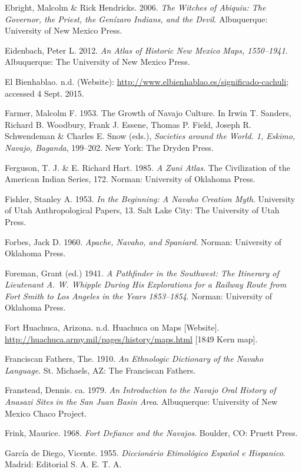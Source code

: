 \begin{hang}
	Ebright, Malcolm \& Rick Hendricks. 2006. \textit{The Witches of Abiquiu: The Governor, the Priest, the Genízaro Indians, and the Devil}.  Albuquerque:  University of New Mexico Press.

	Eidenbach, Peter L.  2012.  \textit{An Atlas of Historic New Mexico Maps, 1550--1941}.  Albuquerque:  The University of New Mexico Press.

	El Bienhablao. n.d.  (Website): \url{http://www.elbienhablao.es/significado-cachuli}; accessed 4 Sept. 2015.

	Farmer, Malcolm F.  1953.  The Growth of Navajo Culture.  In  Irwin T. Sanders, Richard B. Woodbury, Frank J. Essene, Thomas P. Field, Joseph R. Schwendeman \& Charles E. Snow (eds.), \textit{Societies around the World.  1, Eskimo, Navajo, Baganda},   199--202.  New York:  The Dryden Press.

	Ferguson, T. J. \& E. Richard Hart. 1985. \textit{A Zuni Atlas}.  The Civilization of the American Indian Series, 172.  Norman:  University of Oklahoma Press.

	Fishler, Stanley A.  1953. \textit{In the Beginning: A Navaho Creation Myth}.  University of Utah Anthropological Papers, 13.  Salt Lake City:  The University of Utah Press.

	Forbes, Jack D. 1960.  \textit{Apache, Navaho, and Spaniard}.  Norman:  University of Oklahoma Press.

	Foreman, Grant (ed.)  1941. \textit{A Pathfinder in the Southwest: The Itinerary of Lieutenant A. W. Whipple During His Explorations for a Railway Route from Fort Smith to Los Angeles in the Years 1853--1854}.  Norman:  University of Oklahoma Press.

	Fort Huachuca, Arizona. n.d.  Huachuca on Maps [Website]. \url{http://huachuca.army.mil/pages/history/maps.html} [1849 Kern map].

	Franciscan Fathers, The. 1910. \textit{An Ethnologic Dictionary of the Navaho Language}.  St. Michaels, AZ:  The Franciscan Fathers.

	Franstead, Dennis. ca. 1979. \textit{An Introduction to the Navajo Oral History of Anasazi Sites in the San Juan Basin Area}.  Albuquerque:  University of New Mexico Chaco Project.

	Frink, Maurice. 1968. \textit{Fort Defiance and the Navajos}.  Boulder, CO:  Pruett Press.

	García de Diego, Vicente. 1955. \textit{Diccionário Etimológico Español e Hispanico}.  Madrid:  Editorial S. A. E. T. A.


\end{hang}
